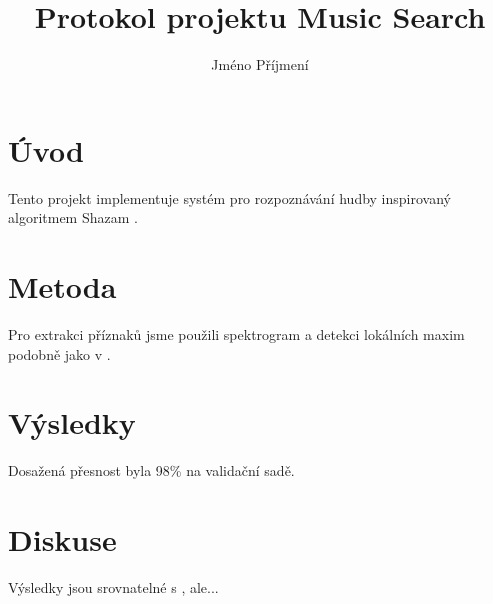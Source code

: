 \documentclass[12pt]{article}
\title{Protokol projektu Music Search}
\author{Jméno Příjmení}
\begin{document}
\maketitle
\thispagestyle{empty}

\section*{Úvod}

Tento projekt implementuje systém pro rozpoznávání hudby inspirovaný algoritmem Shazam \cite{wang2003}.

\section*{Metoda}

Pro extrakci příznaků jsme použili spektrogram \cite{scipy} a detekci lokálních maxim podobně jako v \cite{wang2003}.

\section*{Výsledky}

Dosažená přesnost byla 98\% na validační sadě.

\section*{Diskuse}

Výsledky jsou srovnatelné s \cite{wang2003}, ale...

\newpage
\printbibliography[title={Reference}]
\end{document}
